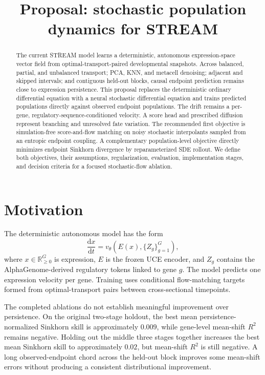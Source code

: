 \documentclass[11pt]{article}
\title{Proposal: stochastic population dynamics for STREAM}
\author{}
\date{}
\newcommand{\stream}{STREAM}
\newcommand{\uce}{UCE}
\newcommand{\R}{\mathbb{R}}
\newcommand{\dd}{\mathrm{d}}
\begin{document}
\maketitle

\begin{abstract}
The current \stream{} model learns a deterministic, autonomous expression-space
vector field from optimal-transport-paired developmental snapshots. Across
balanced, partial, and unbalanced transport; PCA, KNN, and metacell denoising;
adjacent and skipped intervals; and contiguous held-out blocks, causal endpoint
prediction remains close to expression persistence. This proposal replaces the
deterministic ordinary differential equation with a neural stochastic
differential equation and trains predicted populations directly against
observed endpoint populations. The drift remains a per-gene,
regulatory-sequence-conditioned velocity. A score head and prescribed
diffusion represent branching and unresolved fate variation. The recommended
first objective is simulation-free score-and-flow matching on noisy stochastic
interpolants sampled from an entropic endpoint coupling. A complementary
population-level objective directly minimizes endpoint Sinkhorn divergence by
reparameterized SDE rollout. We define both objectives, their assumptions,
regularization, evaluation, implementation stages, and decision criteria for a
focused stochastic-flow ablation.
\end{abstract}

\section{Motivation}

The deterministic autonomous model has the form
\begin{equation}
  \frac{\dd x}{\dd t}
  = v_\theta\!\left(E(x), \{Z_g\}_{g=1}^{G}\right),
  \label{eq:ode}
\end{equation}
where $x\in\R^G_{\geq 0}$ is expression, $E$ is the frozen \uce{}
encoder, and $Z_g$ contains the AlphaGenome-derived regulatory tokens linked to
gene $g$. The model predicts one expression velocity per gene. Training uses
conditional flow-matching targets formed from optimal-transport pairs between
cross-sectional timepoints.

The completed ablations do not establish meaningful improvement over
persistence. On the original two-stage holdout, the best mean
persistence-normalized Sinkhorn skill is approximately $0.009$, while
gene-level mean-shift $R^2$ remains negative. Holding out the middle three
stages together increases the best mean Sinkhorn skill to approximately $0.02$,
but mean-shift $R^2$ is still negative. A long observed-endpoint chord across
the held-out block improves some mean-shift errors without producing a
consistent distributional improvement.
\end{document}
